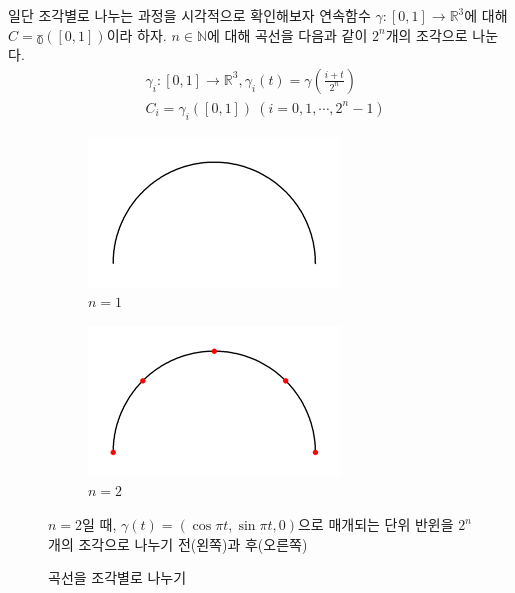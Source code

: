 \documentclass{gshs_thesis}
\theoremstyle{theorem}
\theoremstyle{lemma}
\theoremstyle{definition}
\begin{document}
일단 조각별로 나누는 과정을 시각적으로 확인해보자
연속함수 $\gamma:[0,1]\rightarrow\mathbb{R}^{3}$에 대해 $C=\mathbb{\gamma}([0,1])$이라 하자. $n\in\mathbb{N}$에 대해 곡선을 다음과 같이 $2^{n}$개의 조각으로 나눈다.
\begin{equation}
	\begin{split}
		&\gamma_{i}:[0,1]\rightarrow\mathbb{R}^{3},\gamma_{i}(t)=\gamma\left(\frac{i+t}{2^{n}}\right)  \\
		&C_{i}=\gamma_{i}([0,1])\  (i=0,1,\cdots,2^{n}-1)
	\end{split}
\end{equation}
\begin{figure}[h]
	\begin{center}
		\begin{subfigure}{.4\textwidth}
			\includegraphics[width=\textwidth]{image/arcpiece1}
			\caption{$n=1$}
		\end{subfigure}
		\begin{subfigure}{.4\textwidth}
			\includegraphics[width=\textwidth]{image/arcpiece2}
			\caption{$n=2$}
		\end{subfigure}
	\end{center} 
    \caption{곡선을 조각별로 나누기}
	\raggedright \small  $n=2$일 때, $\gamma(t)=(\cos\pi{t},\sin\pi{t},0)$으로 매개되는 단위 반윈을 $2^{n}$개의 조각으로 나누기 전(왼쪽)과 후(오른쪽)
\end{figure}
\end{document}
